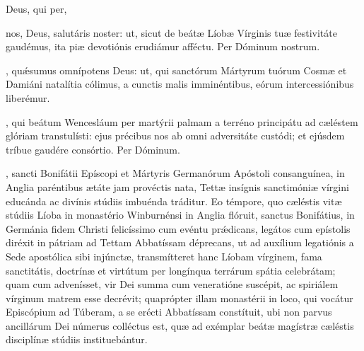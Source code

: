 \documentclass[fontsize=9pt,paper=A6,twoside,BCOR=1mm,DIV=22,headinclude]{scrarticle}
\begin{document}
\begin{multicols}{2}
{

\AiiiBMV

\VRBMViii

 Deus, qui per, 

}


{

\VRVi

\MiV

 nos, Deus, salutáris noster: ut, sicut de beátæ Líobæ Vírginis tuæ festivitáte gaudémus, ita piæ devotiónis erudiámur afféctu. Per Dóminum nostrum.

}


\AiiiMm

\VRMmiii

, qu\'æsumus omnípotens Deus: ut, qui sanctórum Mártyrum tuórum Cosmæ et Damiáni natalítia cólimus, a cunctis malis imminéntibus, eórum intercessiónibus liberémur.


\AiM

\VRMi

, qui beátum Wencesláum per martýrii palmam a terréno principátu ad cæléstem glóriam transtulísti: ejus précibus nos ab omni adversitáte custódi; et ejúsdem tríbue gaudére consórtio. Per Dóminum.

, sancti Bonifátii Epíscopi et Mártyris Germanórum Apóstoli consanguínea, in Anglia paréntibus ætáte jam provéctis nata, Tettæ insígnis sanctimóniæ vírgini educánda ac divínis stúdiis imbuénda tráditur. Eo témpore, quo cæléstis vitæ stúdiis Líoba in monastério Winburnénsi in Anglia flóruit, sanctus Bonifátius, in Germánia fidem Christi felicíssimo cum evéntu pr\'ædicans, legátos cum epístolis diréxit in pátriam ad Tettam Abbatíssam déprecans, ut ad auxílium legatiónis a Sede apostólica sibi injúnctæ, transmítteret hanc Líobam vírginem, fama sanctitátis, doctrínæ et virtútum per longínqua terrárum spátia celebrátam; quam cum advenísset, vir Dei summa cum veneratióne suscépit, ac spiriálem vírginum matrem esse decrévit; quaprópter illam monastérii in loco, qui vocátur Episcópium ad Túberam, a se erécti Abbatíssam constítuit, ubi non parvus ancillárum Dei númerus colléctus est, quæ ad exémplar beátæ magístræ cæléstis disciplínæ stúdiis instituebántur.


\end{multicols}
\end{document}
